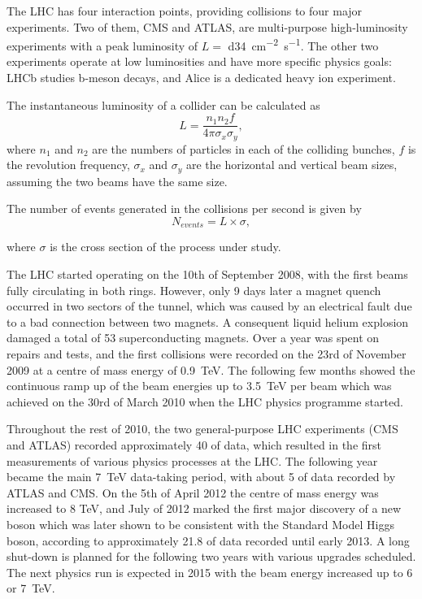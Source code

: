 
The LHC has four interaction points, providing collisions to four major experiments. Two of them, CMS and ATLAS, are
multi-purpose high-luminosity experiments with a peak luminosity of $L = $ \SI{d34}{\cm^{-2} s^{-1}}. The other two
experiments operate at low luminosities and have more specific physics goals: LHCb studies b-meson decays, and Alice is
a dedicated heavy ion experiment.

The instantaneous luminosity of a collider can be calculated as
\begin{equation}
	L = \frac{n_1 n_2 f}{4 \pi \sigma_x \sigma_y},
\end{equation}
where $n_1$ and $n_2$ are the numbers of particles in each of the colliding bunches, $f$ is the revolution frequency,
$\sigma_x$ and $\sigma_y$ are the horizontal and vertical beam sizes, assuming the two beams have the same size.

The number of events generated in the collisions per second is given by
\begin{equation}
	N_{events} = L \times \sigma,
\end{equation}

where $\sigma$ is the cross section of the process under study.


The LHC started operating on the 10th of September 2008, with the first beams fully circulating in both rings. However,
only 9 days later a magnet quench occurred in two sectors of the tunnel, which was caused by an electrical fault due to
a bad connection between two magnets. A consequent liquid helium explosion damaged a total of 53 superconducting
magnets. Over a year was spent on repairs and tests, and the first collisions were recorded on the 23rd of November 2009
at a centre of mass energy of \SI{0.9}{\TeV}. The following few months showed the continuous ramp up of the beam
energies up to \SI{3.5}{\TeV} per beam which was achieved on the 30rd of March 2010 when the LHC physics programme
started.

Throughout the rest of 2010, the two general-purpose LHC experiments (CMS and ATLAS) recorded approximately
\SI{40}{\invpb} of data, which resulted in the first measurements of various physics processes at the LHC. The following
year became the main \SI{7}{\TeV} data-taking period, with about \SI{5}{\invfb} of data recorded by ATLAS and CMS. On
the 5th of April 2012 the centre of mass energy was increased to 8 TeV, and July of 2012 marked the first major
discovery of a new boson which was later shown to be consistent with the Standard Model Higgs boson, according to
approximately \SI{21.8}{\invfb} of data recorded until early 2013. A long shut-down is planned for the following two
years with various upgrades scheduled. The next physics run is expected in 2015 with the beam energy increased up to 6
or \SI{7}{\TeV}.


